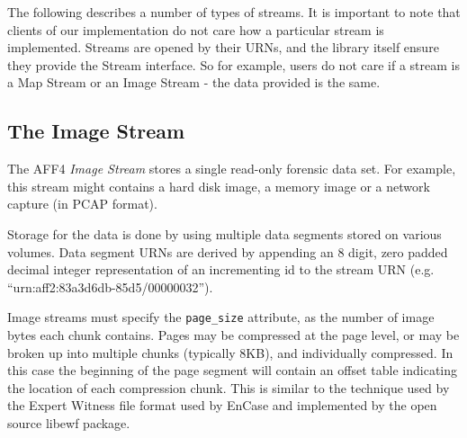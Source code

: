 \documentclass[10pt, conference]{IEEEtran}
\begin{document}
The following describes a number of types of streams. It is important
to note that clients of our implementation do not care how a
particular stream is implemented. Streams are opened by their URNs,
and the library itself ensure they provide the Stream interface. So
for example, users do not care if a stream is a Map Stream or an Image
Stream - the data provided is the same.




\subsection{The Image Stream}
\label{image_stream}
The AFF4 \emph{Image Stream} stores a single read-only forensic data
set. For example, this stream might contains a hard disk image, a
memory image or a network capture (in PCAP format).

Storage for the data is done by using multiple data segments stored on
various volumes. Data segment URNs are derived by appending an 8
digit, zero padded decimal integer representation of an incrementing
id to the stream URN (e.g. ``urn:aff2:83a3d6db-85d5/00000032''). 


Image streams must specify the
\texttt{page\_size} attribute, as the number of image bytes each chunk
contains. Pages may be compressed at the page level, or may be broken
up into multiple chunks (typically 8KB), and individually
compressed. In this case the beginning of the page segment will
contain an offset table indicating the location of each compression
chunk. This is similar to the technique used by the Expert Witness
file format used by EnCase\cite{encase-3.0} and implemented by the
open source libewf\cite{libewf} package.
\end{document}
